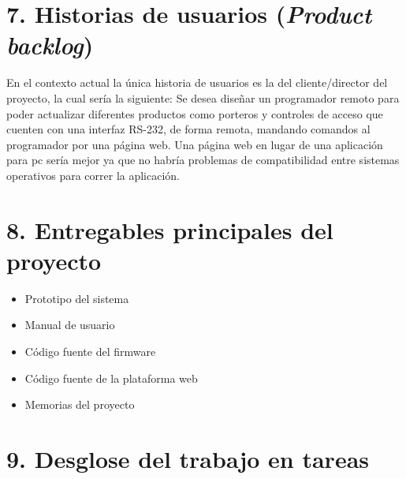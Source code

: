 \documentclass[
11pt, %
]{charter}
\begin{document}
\section{7. Historias de usuarios (\textit{Product backlog})}
\label{sec:backlog}

En el contexto actual la única historia de usuarios es la del cliente/director del proyecto, la cual sería la siguiente:
Se desea diseñar un programador remoto para poder actualizar diferentes productos como porteros y controles de acceso que cuenten con una interfaz RS-232, de forma remota, mandando comandos al programador por una página web. Una página web en lugar de una aplicación para pc sería mejor ya que no habría problemas de compatibilidad entre sistemas operativos para correr la aplicación.


\section{8. Entregables principales del proyecto}
\label{sec:entregables}

\begin{itemize}
	\item Prototipo del sistema
	\item Manual de usuario
	\item Código fuente del firmware
	\item Código fuente de la plataforma web
	\item Memorias del proyecto
\end{itemize}


\section{9. Desglose del trabajo en tareas}
\label{sec:wbs}
\end{document}

